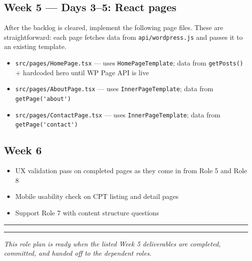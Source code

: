 \documentclass[11pt,a4paper]{article}
\newcommand{\grouprule}{\vspace{0.3em}\textcolor{ruleLine}{\rule{\linewidth}{0.4pt}}\vspace{0.3em}}
\begin{document}
\subsection{Week 5 — Days 3–5: React pages}

After the backlog is cleared, implement the following page files. These are straightforward: each page fetches data from \nolinkurl{api/wordpress.js} and passes it to an existing template.

\begin{itemize}
\item \nolinkurl{src/pages/HomePage.tsx} — uses \nolinkurl{HomePageTemplate}; data from \nolinkurl{getPosts()} + hardcoded hero until WP Page API is live
\item \nolinkurl{src/pages/AboutPage.tsx} — uses \nolinkurl{InnerPageTemplate}; data from \nolinkurl{getPage('about')}
\item \nolinkurl{src/pages/ContactPage.tsx} — uses \nolinkurl{InnerPageTemplate}; data from \nolinkurl{getPage('contact')}
\end{itemize}

\subsection{Week 6}

\begin{itemize}
\item UX validation pass on completed pages as they come in from Role 5 and Role 8
\item Mobile usability check on CPT listing and detail pages
\item Support Role 7 with content structure questions
\end{itemize}

\grouprule
\vspace{1.2em}
\textcolor{uvtYellow}{\rule{\linewidth}{1.5pt}}

{\small\textit{This role plan is ready when the listed Week 5 deliverables are completed, committed, and handed off to the dependent roles.}}
\end{document}
